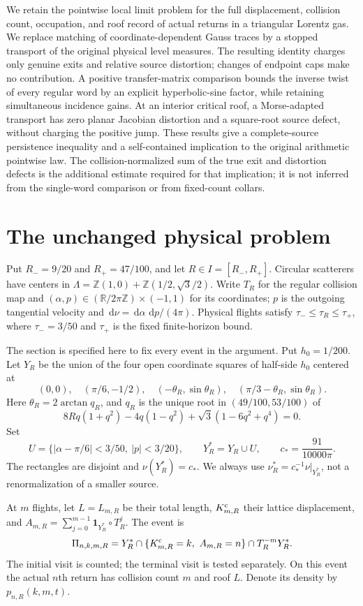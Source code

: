 \documentclass[11pt,reqno]{amsart}
\numberwithin{equation}{section}
\theoremstyle{definition}\newtheorem{definition}[theorem]{Definition}
\theoremstyle{remark}\newtheorem{remark}[theorem]{Remark}
\newcommand{\R}{\mathbb R}\newcommand{\Z}{\mathbb Z}\newcommand{\T}{\mathbb T}
\newcommand{\dd}{\,\mathrm d}\newcommand{\one}{\mathbf1}
\theoremstyle{definition}\newtheorem{inputstatement}[theorem]{Input statement}
\begin{document}
We retain the pointwise local limit problem for the full displacement,
collision count, occupation, and roof record of actual returns in a
triangular Lorentz gas. We replace matching of coordinate-dependent
Gauss traces by a stopped transport of the original physical level
measures. The resulting identity charges only genuine exits and
relative source distortion; changes of endpoint caps make no
contribution. A positive transfer-matrix comparison bounds the inverse
twist of every regular word by an explicit hyperbolic-sine factor,
while retaining simultaneous incidence gains. At an interior critical
roof, a Morse-adapted transport has zero planar Jacobian distortion
and a square-root source defect, without charging the positive jump.
These results give a complete-source persistence inequality and a
self-contained implication to the original arithmetic pointwise law.
The collision-normalized sum of the true exit and distortion defects
is the additional estimate required for that implication; it is not
inferred from the single-word comparison or from fixed-count collars.



\section{The unchanged physical problem}
Put $R_-=9/20$ and $R_+=47/100$, and let $R\in I=[R_-,R_+]$. Circular scatterers have centers in
$\Lambda=\Z(1,0)+\Z(1/2,\sqrt3/2)$. Write $T_R$ for the regular
collision map and $(\alpha,p)\in(\R/2\pi\Z)\times(-1,1)$ for its
coordinates; $p$ is the outgoing tangential velocity and
$\dd\nu=\dd\alpha\,\dd p/(4\pi)$. Physical flights satisfy
$\tau_-\le\tau_R\le\tau_+$, where $\tau_-=3/50$ and $\tau_+$
is the fixed finite-horizon bound.

The section is specified here to fix every event in the argument.
Put $h_0=1/200$. Let $Y_R$ be the union of the four open coordinate
squares of half-side $h_0$ centered at
\[
 (0,0),\quad(\pi/6,-1/2),\quad
 (-\theta_R,\sin\theta_R),\quad
 (\pi/3-\theta_R,\sin\theta_R).
\]
Here $\theta_R=2\arctan q_R$, and $q_R$ is the unique root in
$(49/100,53/100)$ of
\[
 8Rq(1+q^2)-4q(1-q^2)+\sqrt3(1-6q^2+q^4)=0.
\]
Set
\[
 U=\{|\alpha-\pi/6|<3/50,\ |p|<3/20\},\qquad
 Y_R^*=Y_R\cup U,\qquad c_*=\frac{91}{10000\pi}.
\]
The rectangles are disjoint and $\nu(Y_R^*)=c_*$. We always use
$\nu_R^*=c_*^{-1}\nu|_{Y_R^*}$, not a renormalization of a smaller
source.

At $m$ flights, let $L=L_{m,R}$ be their total length,
$K^{\rm c}_{m,R}$ their lattice displacement, and
$A_{m,R}=\sum_{j=0}^{m-1}\one_{Y_R^*}\circ T_R^j$. The event is
\begin{equation}\label{eq:v76-event}
 \Pi_{n,k,m,R}=Y_R^*\cap\{K^{\rm c}_{m,R}=k,\ A_{m,R}=n\}
                         \cap T_R^{-m}Y_R^*.
\end{equation}
The initial visit is counted; the terminal visit is tested separately.
On this event the actual $n$th return has collision count $m$ and
roof $L$. Denote its density by $p_{n,R}(k,m,t)$.
\end{document}
